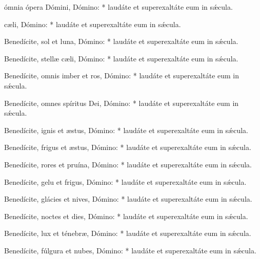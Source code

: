  ómnia ópera Dómini, Dómino: * laudáte et superexaltáte eum in sǽcula.\par
{}
 c{\ae}li, Dómino:  * laudáte et superexaltáte eum in sǽcula.\par
{}
Benedícite, sol et luna, Dómino: * laudáte et superexaltáte eum in sǽcula.\par
Benedícite, stell{\ae} c{\ae}li, Dómino: * laudáte et superexaltáte eum in sǽcula.\par
Benedícite, omnis imber et ros, Dómino: * laudáte et superexaltáte eum in sǽcula.\par
Benedícite, omnes spíritus Dei, Dómino: * laudáte et superexaltáte eum in sǽcula.\par
Benedícite, ignis et {\ae}stus, Dómino: * laudáte et superexaltáte eum in sǽcula.\par
Benedícite, frigus et {\ae}stus, Dómino: * laudáte et superexaltáte eum in sǽcula.\par
Benedícite, rores et pruína, Dómino: * laudáte et superexaltáte eum in sǽcula.\par
Benedícite, gelu et frigus, Dómino: * laudáte et superexaltáte eum in sǽcula.\par
Benedícite, glácies et nives, Dómino: * laudáte et superexaltáte eum in sǽcula.\par
Benedícite, noctes et dies, Dómino: * laudáte et superexaltáte eum in sǽcula.\par
Benedícite, lux et ténebr{\ae}, Dómino: * laudáte et superexaltáte eum in sǽcula.\par
Benedícite, fúlgura et nubes, Dómino: * laudáte et superexaltáte eum in sǽcula.\par

